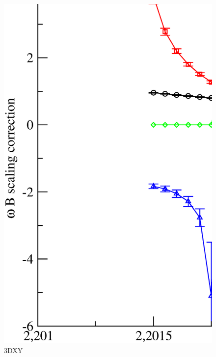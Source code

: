 \begin{figure}[!htpb]
  \centering
  \includegraphics[width=15cm]{./plots/3DXY/3DXY_omega_from_B_vs_Temperature.eps}
  \caption{3DXY}
\end{figure}

